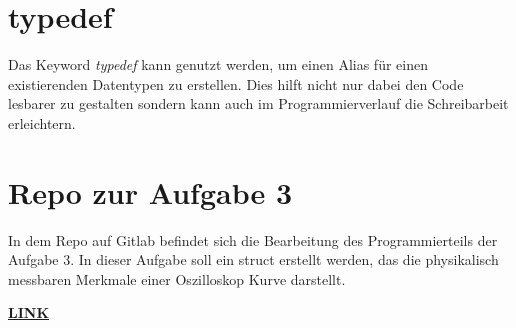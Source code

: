 \section{typedef}
Das Keyword \textit{typedef} kann genutzt werden, um einen Alias für einen existierenden Datentypen zu erstellen.
Dies hilft nicht nur dabei den Code lesbarer zu gestalten sondern kann auch im Programmierverlauf die Schreibarbeit erleichtern\cite{boekelmann:2023}.

\section{Repo zur Aufgabe 3}
In dem Repo auf Gitlab befindet sich die Bearbeitung des Programmierteils der Aufgabe 3. 
In dieser Aufgabe soll ein struct erstellt werden, das die physikalisch messbaren Merkmale einer Oszilloskop Kurve darstellt.\par
\href{https://gitlab.thga.de/daniel.krueger/pruefung_sose_2023_aufgabe_3_struct}{\textbf{LINK}} 
